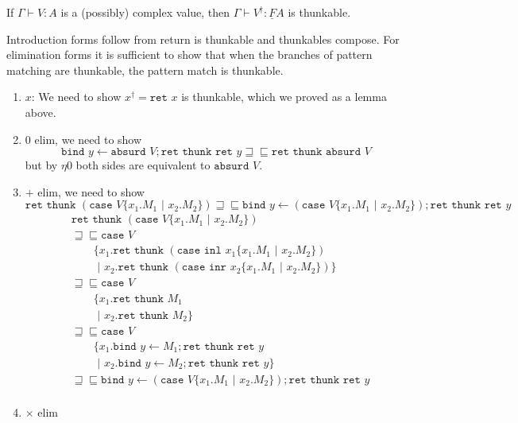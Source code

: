 \documentclass[acmsmall,screen,12pt]{acmart}
\renewcommand{\u}{\underline}
\newcommand{\pipe}{\,\,|\,\,}
\newcommand{\ltdyn}{\sqsubseteq}
\newcommand{\gtdyn}{\sqsupseteq}
\newcommand{\equidyn}{\mathrel{\gtdyn\ltdyn}}
\newcommand{\simp}[1]{{#1}^{\dag}}
\newcommand{\inl}{\kw{inl}}
\newcommand{\inr}{\kw{inr}}
\newcommand{\bindXtoYinZ}[2]{\kw{bind}#2 \leftarrow #1;}
\newcommand{\case}{\kw{case}}
\newcommand{\kw}[1]{\texttt{#1}\,\,}
\newcommand{\absurd}{\kw{absurd}}
\newcommand{\caseofXthenYelseZ}[3]{\case #1 \{ #2 \pipe #3 \}}
\newcommand{\caseofX}[1]{\case #1}
\newcommand{\thenY}{\{}
\newcommand{\elseZ}[1]{\pipe #1 \}}
\newcommand{\ret}{\kw{ret}}
\newcommand{\thunk}{\kw{thunk}}
\begin{document}
{\begin{longonly}
\begin{lemma}
  If $\Gamma \vdash V : A$ is a (possibly) complex value, then $\Gamma
  \vdash \simp V : \u F A$ is thunkable.
\end{lemma}
\begin{longproof}
  Introduction forms follow from return is thunkable and thunkables
  compose. For elimination forms it is sufficient to show that when
  the branches of pattern matching are thunkable, the pattern match
  is thunkable.
  \begin{enumerate}
  \item $x$: We need to show $\simp x = \ret x$ is thunkable, which we
    proved as a lemma above.
  \item{} $0$ elim, we need to show 
    \[ \bindXtoYinZ {\absurd V} y \ret\thunk\ret y\equidyn \ret\thunk {\absurd V}\]
    but by $\eta0$ both sides are equivalent to $\absurd V$.
  \item{} $+$ elim, we need to show
    \[
    \ret\thunk (\caseofXthenYelseZ V {x_1. M_1} {x_2. M_2})
    \equidyn 
    \bindXtoYinZ {(\caseofXthenYelseZ V {x_1. M_1} {x_2. M_2})} y \ret\thunk \ret y
    \]
    \begin{align*}
      &\ret\thunk (\caseofXthenYelseZ V {x_1. M_1} {x_2. M_2})\\
      &\equidyn
      \caseofX V \tag{$+\eta$}\\
      &\qquad\thenY {x_1. \ret\thunk (\caseofXthenYelseZ {\inl x_1} {x_1. M_1} {x_2. M_2})}\\
      &\qquad\elseZ {x_2. \ret\thunk (\caseofXthenYelseZ {\inr x_2} {x_1. M_1} {x_2. M_2})}\\
      &\equidyn\caseofX V \tag{$+\beta$}\\
      &\qquad\thenY {x_1. \ret\thunk M_1}\\
      &\qquad\elseZ {x_2. \ret\thunk M_2}\\
      &\equidyn\caseofX V \tag{$M_1,M_2$ thunkable}\\
      &\qquad\thenY {x_1. \bindXtoYinZ {M_1} y \ret\thunk\ret y}\\
      &\qquad\elseZ {x_2. \bindXtoYinZ {M_2} y \ret\thunk\ret y}\\
      &\equidyn \bindXtoYinZ {(\caseofXthenYelseZ V {x_1. M_1}{x_2. M_2})} y \ret\thunk\ret y\tag{commuting conversion}\\
    \end{align*}
  \item{} $\times$ elim

\end{enumerate}
\end{longproof}
\end{longonly}}
\end{document}
